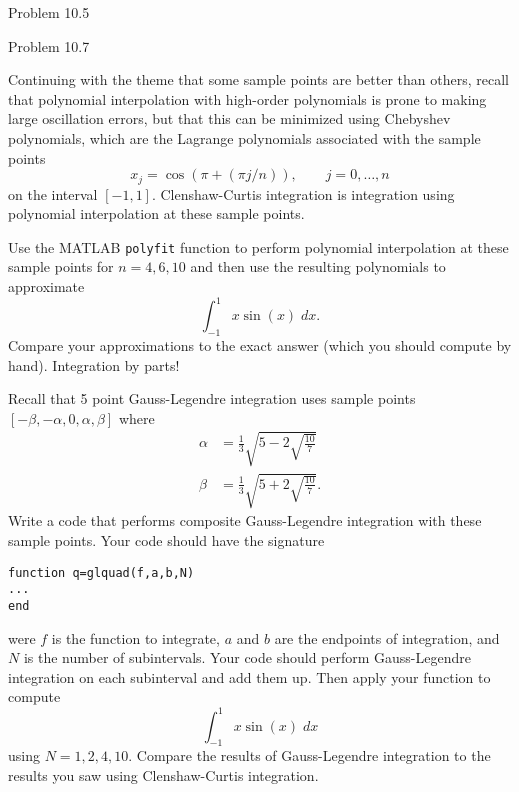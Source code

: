 \documentclass[minion]{homework}
\begin{document}
\begin{aproblems}
\vskip 0.5cm

\aproblem Problem 10.5

\aproblem Problem 10.7

\aproblem Continuing with the theme that some sample points are better than others, recall that polynomial interpolation with high-order polynomials is prone to making large oscillation errors, but that this can be minimized
using Chebyshev polynomials, which are the Lagrange polynomials associated
with the sample points 
\[
x_j= \cos(\pi+(\pi j/n)),\qquad j=0,\ldots,n
\]
on the interval $[-1,1]$.
Clenshaw-Curtis integration is integration using polynomial interpolation at
these sample points.

Use the MATLAB \texttt{polyfit} function to perform polynomial
interpolation at these sample points for $n=4,6,10$ and then
use the resulting polynomials to approximate
\[
\int_{-1}^1 x\sin(x)\;dx.
\]
Compare your approximations to the exact answer (which you should
compute by hand).  Integration by parts!

\aproblem Recall that 5 point Gauss-Legendre integration
uses sample points
$[-\beta,-\alpha,0,\alpha,\beta]$ where
\[
\begin{aligned}
\alpha &= \frac{1}{3}\sqrt{5-2\sqrt{\frac{10}{7}}}\\
\beta &= \frac{1}{3}\sqrt{5+2\sqrt{\frac{10}{7}}}.
\end{aligned}
\]
Write a code that performs composite Gauss-Legendre integration
with these sample points.  Your code should have the signature
\begin{verbatim}
function q=glquad(f,a,b,N)
...
end
\end{verbatim}
were $f$ is the function to integrate, $a$ and $b$ are the endpoints
of integration, and $N$ is the number of subintervals. Your code
should perform Gauss-Legendre integration on each subinterval and add them up.
Then apply your function to compute
\[
\int_{-1}^1 x\sin(x)\;dx
\]
using $N=1,2,4,10$.  Compare the results of Gauss-Legendre integration
to the results you saw using Clenshaw-Curtis integration.

\end{aproblems}
\end{document}
